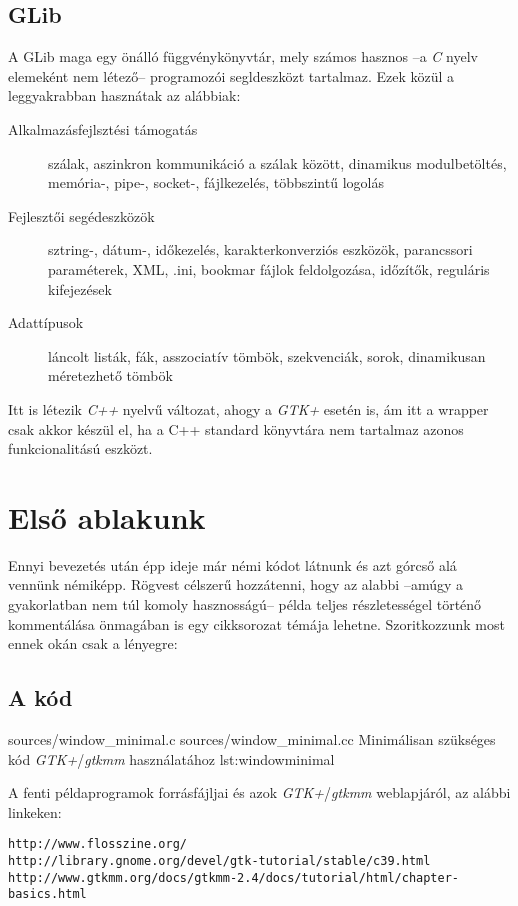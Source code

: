 \subsection{GLib}
A GLib maga egy önálló függvénykönyvtár, mely számos hasznos --a \textit{C} nyelv elemeként nem létező-- programozói segldeszközt tartalmaz. Ezek közül a leggyakrabban hasznátak az alábbiak:

\begin{description}
 \item[Alkalmazásfejlsztési támogatás] szálak, aszinkron kommunikáció a szálak között, dinamikus modulbetöltés, memória-, pipe-, socket-, fájlkezelés, többszintű logolás
 \item[Fejlesztői segédeszközök] sztring-, dátum-, időkezelés, karakterkonverziós eszközök, parancssori paraméterek, XML, .ini, bookmar fájlok feldolgozása, időzítők, reguláris kifejezések
 \item[Adattípusok] láncolt listák, fák, asszociatív tömbök, szekvenciák, sorok, dinamikusan méretezhető tömbök
\end{description}

Itt is létezik \textit{C++} nyelvű változat, ahogy a \textit{GTK+} esetén is, ám itt a wrapper csak akkor készül el, ha a C++ standard könyvtára nem tartalmaz azonos funkcionalitású eszközt.

\section{Első ablakunk}

Ennyi bevezetés után épp ideje már némi kódot látnunk és azt górcső alá vennünk némiképp. Rögvest célszerű hozzátenni, hogy az alabbi --amúgy a gyakorlatban nem túl komoly hasznosságú-- példa teljes részletességel történő kommentálása önmagában is egy cikksorozat témája lehetne. Szoritkozzunk most ennek okán csak a lényegre:

\subsection{A kód}

\lstinputsources
{sources/window_minimal.c}
{sources/window_minimal.cc}
{Minimálisan szükséges kód \textit{GTK+}/\textit{gtkmm} használatához}
{lst:windowminimal}


A fenti példaprogramok forrásfájljai és azok \textit{GTK+}/\textit{gtkmm} weblapjáról, az alábbi linkeken:

\begin{verbatim}
http://www.flosszine.org/
http://library.gnome.org/devel/gtk-tutorial/stable/c39.html
http://www.gtkmm.org/docs/gtkmm-2.4/docs/tutorial/html/chapter-basics.html
\end{verbatim}

